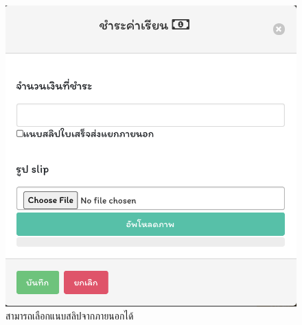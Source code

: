 \begin{figure}
    \begin{center}
      \includegraphics[width=\linewidth]{images/UpdatePayment.png}
    \end{center}
    \caption[Poem]{สามารถเลือกแนบสลิปจากภายนอกได้}
    \label{fig:UpdatePay}
\end{figure}

